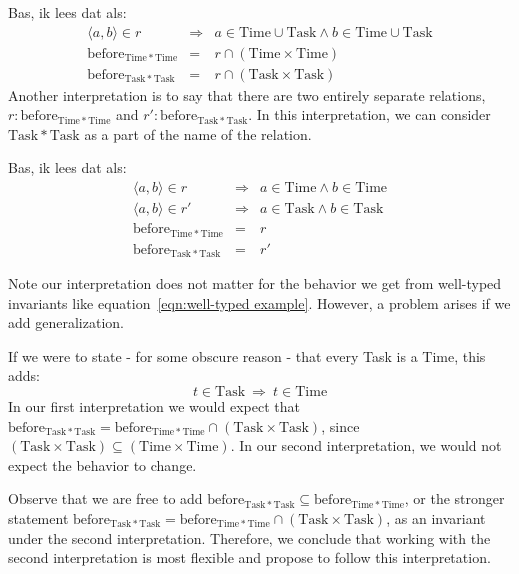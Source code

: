 \documentclass[12pt]{article}
\newcommand{\pair}[2]{\langle{#1},{#2}\rangle}
\begin{document}
Bas, ik lees dat als:
\begin{eqnarray}
    \pair{a}{b}\in r&\Rightarrow&a\in\mathrm{Time}\cup\mathrm{Task}\wedge b\in\mathrm{Time}\cup\mathrm{Task}\\
    \mathrm{before}_{\mathrm{Time * Time}}&=&r\cap (\mathrm{Time}\times\mathrm{Time})\\
    \mathrm{before}_{\mathrm{Task * Task}}&=&r\cap (\mathrm{Task}\times\mathrm{Task})
\end{eqnarray}
Another interpretation is to say that there are two entirely separate relations,
$r:\mathrm{before}_{\mathrm{Time * Time}}$ and $r':\mathrm{before}_{\mathrm{Task * Task}}$.
In this interpretation, we can consider ${\mathrm{Task * Task}}$ as a part of the name of the relation.

Bas, ik lees dat als:
\begin{eqnarray}
    \pair{a}{b}\in r&\Rightarrow&a\in\mathrm{Time}\wedge b\in\mathrm{Time}\\
    \pair{a}{b}\in r'&\Rightarrow&a\in\mathrm{Task}\wedge b\in\mathrm{Task}\\
    \mathrm{before}_{\mathrm{Time * Time}}&=&r\\
    \mathrm{before}_{\mathrm{Task * Task}}&=&r'
\end{eqnarray}

Note our interpretation does not matter for the behavior we get from well-typed invariants like equation~\ref{eqn:well-typed example}.
However, a problem arises if we add generalization.

If we were to state - for some obscure reason - that every Task is a Time, this adds:
\begin{equation}
    t\in\mathrm{Task}\ \Rightarrow\ t\in\mathrm{Time}
\end{equation}
In our first interpretation we would expect that $\mathrm{before}_{\mathrm{Task * Task}} = \mathrm{before}_{\mathrm{Time * Time}} \cap (\mathrm{Task}\times\mathrm{Task})$, since $(\mathrm{Task}\times\mathrm{Task}) \subseteq (\mathrm{Time}\times\mathrm{Time})$.
In our second interpretation, we would not expect the behavior to change.

Observe that we are free to add $\mathrm{before}_{\mathrm{Task * Task}} \subseteq \mathrm{before}_{\mathrm{Time * Time}}$, or the stronger statement $\mathrm{before}_{\mathrm{Task * Task}} = \mathrm{before}_{\mathrm{Time * Time}} \cap (\mathrm{Task}\times\mathrm{Task})$, as an invariant under the second interpretation.
Therefore, we conclude that working with the second interpretation is most flexible and propose to follow this interpretation.
\end{document}
